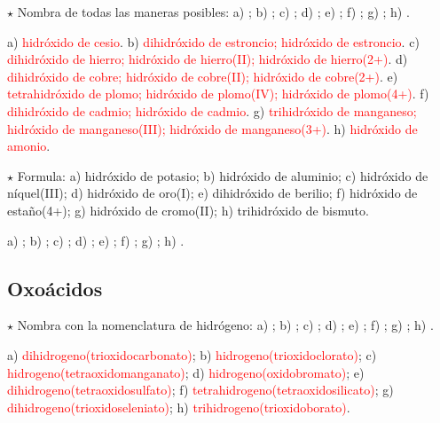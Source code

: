 \begin{exercise}
    \(\star\) Nombra de todas las maneras posibles: a) ; b) ; c) ; d) ; e)
    ; f) ; g) ; h) .
    \begin{solu}
        a) \textcolor{red}{hidróxido de cesio}. b) \textcolor{red}{dihidróxido de estroncio; hidróxido de estroncio}. c)
        \textcolor{red}{dihidróxido de hierro; hidróxido de hierro(II); hidróxido de hierro(2+)}. d) \textcolor{red}{dihidróxido de
        cobre; hidróxido de cobre(II); hidróxido de cobre(2+)}. e) \textcolor{red}{tetrahidróxido de plomo; hidróxido de plomo(IV);
        hidróxido de plomo(4+)}. f) \textcolor{red}{dihidróxido de cadmio; hidróxido de cadmio}. g) \textcolor{red}{trihidróxido
        de manganeso; hidróxido de manganeso(III); hidróxido de manganeso(3+)}. h) \textcolor{red}{hidróxido de amonio}.
    \end{solu}
\end{exercise}

\begin{exercise}
    \(\star\) Formula: a) hidróxido de potasio; b) hidróxido de aluminio; c) hidróxido de níquel(III); d) hidróxido de oro(I);
    e) dihidróxido de berilio; f) hidróxido de estaño(4+); g) hidróxido de cromo(II); h) trihidróxido de bismuto.
    \begin{solu}
        a) \textcolor{red}{}; b) \textcolor{red}{}; c) \textcolor{red}{}; d)
        \textcolor{red}{}; e) \textcolor{red}{}; f) \textcolor{red}{}; g)
        \textcolor{red}{}; h) \textcolor{red}{}.
    \end{solu}
\end{exercise}

\subsection{Oxoácidos}

\begin{exercise}
    \(\star\) Nombra con la nomenclatura de hidrógeno: a) ; b) ; c) ; d) ; e) ;
    f) ; g) ; h) .
    \begin{solu}
        a) \textcolor{red}{dihidrogeno(trioxidocarbonato)}; b) \textcolor{red}{hidrogeno(trioxidoclorato)}; c)
        \textcolor{red}{hidrogeno(tetraoxidomanganato)}; d) \textcolor{red}{hidrogeno(oxidobromato)}; e)
        \textcolor{red}{dihidrogeno(tetraoxidosulfato)}; f) \textcolor{red}{tetrahidrogeno(tetraoxidosilicato)}; g)
        \textcolor{red}{dihidrogeno(trioxidoseleniato)}; h) \textcolor{red}{trihidrogeno(trioxidoborato)}.
    \end{solu}
\end{exercise}

